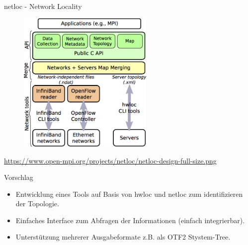 \begin{frame}{netloc - Network Locality}
    \begin{figure}
        \centering
        \includegraphics[width=0.58\textwidth]{fig/netloc-design.png}
    \end{figure}
    \tiny{\href{netloc}{https://www.open-mpi.org/projects/netloc/netloc-design-full-size.png}}
\end{frame}



\begin{frame}{Vorschlag}
    \begin{itemize}
        \item Entwicklung eines Tools auf Basis von hwloc und netloc zum
            identifizieren der Topologie.
        \item Einfaches Interface zum Abfragen der Informationen (einfach integrierbar).
        \item Unterst\"{u}tzung mehrerer Ausgabeformate z.B. als OTF2
            Stystem-Tree.
    \end{itemize}
\end{frame}
